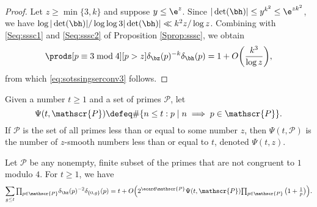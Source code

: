 \documentclass[12pt, reqno, twoside, letterpaper]{amsart}
\begin{document}
\begin{jetsam}
\begin{proof}
%
Let $z \ge \min\{3,k\}$ and suppose $y \le \e^z$.
%
Since $|\det(\bh)| \le y^{k^2} \le \e^{zk^2}$, we have 
$\log |\det(\bh)|/\log\log 3|\det(\bh)| \ll k^2z/\log z$.
%
Combining with \eqref{Seq:sssc1} and 
\eqref{Seq:sssc2} of 
Proposition \ref{Sprop:sssc}, we obtain 
\[
 \prods[p \equiv 3 \bmod 4][p > z]
  \delta_{\bz}(p)^{-k}\delta_{\bh}(p)
   =
    1 + O\bigg(\frac{k^3}{\log z}\bigg),
\]
from which \eqref{eq:sotssingserconv3} follows.
\end{proof}
 
Given a number $t \ge 1$ and a set of primes $\mathscr{P}$, let 
\begin{equation}
 \label{eq:defPsi}
  \Psi(t,\mathscr{P})
   \defeq 
     \#\{n \le t : p \mid n \implies p \in \mathscr{P}\}.
\end{equation}
%
If $\mathscr{P}$ is the set of all primes less than or equal to 
some number $z$, then $\Psi(t,\mathscr{P})$ is the number of 
$z$-smooth numbers less than or equal to $t$, denoted $\Psi(t,z)$.

\begin{proposition}
 \label{prop:ssak=2pre}
Let $\mathscr{P}$ be any nonempty, finite subset of the primes 
that are not congruent to $1$ modulo $4$.
%
For $t \ge 1$, we have 
\[
  \sum_{g \le t}
   {\textstyle \prod_{p \in \mathscr{P}} } \delta_{\bz}(p)^{-2}\delta_{\{0,g\}}(p)
    =
     t 
      + O\Big(
              2^{\ecard\mathscr{P}}
               \Psi(t,\mathscr{P})  
                {\textstyle \prod_{p \in \mathscr{P}}\big(1 + \frac{1}{p}\big)}
         \Big).
\]
\end{proposition}


\end{jetsam}
\end{document}
